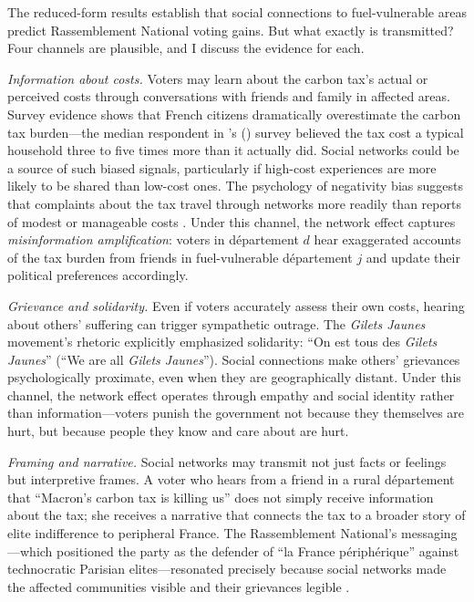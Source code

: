 \documentclass[12pt]{article}
\newcommand{\rn}{Rassemblement National}
\newcommand{\gj}{\textit{Gilets Jaunes}}
\newcommand{\dept}{d\'{e}partement}
\begin{document}
The reduced-form results establish that social connections to fuel-vulnerable areas predict \rn{} voting gains. But what exactly is transmitted? Four channels are plausible, and I discuss the evidence for each.

\textit{Information about costs.} Voters may learn about the carbon tax's actual or perceived costs through conversations with friends and family in affected areas. Survey evidence shows that French citizens dramatically overestimate the carbon tax burden---the median respondent in \citeauthor{douenne2022yellow}'s (\citeyear{douenne2022yellow}) survey believed the tax cost a typical household three to five times more than it actually did. Social networks could be a source of such biased signals, particularly if high-cost experiences are more likely to be shared than low-cost ones. The psychology of negativity bias suggests that complaints about the tax travel through networks more readily than reports of modest or manageable costs \citep{halberstam2016homophily}. Under this channel, the network effect captures \textit{misinformation amplification}: voters in \dept{} $d$ hear exaggerated accounts of the tax burden from friends in fuel-vulnerable \dept{} $j$ and update their political preferences accordingly.

\textit{Grievance and solidarity.} Even if voters accurately assess their own costs, hearing about others' suffering can trigger sympathetic outrage. The \gj{} movement's rhetoric explicitly emphasized solidarity: ``On est tous des \textit{Gilets Jaunes}'' (``We are all \textit{Gilets Jaunes}''). Social connections make others' grievances psychologically proximate, even when they are geographically distant. Under this channel, the network effect operates through empathy and social identity rather than information---voters punish the government not because they themselves are hurt, but because people they know and care about are hurt.

\textit{Framing and narrative.} Social networks may transmit not just facts or feelings but interpretive frames. A voter who hears from a friend in a rural \dept{} that ``Macron's carbon tax is killing us'' does not simply receive information about the tax; she receives a narrative that connects the tax to a broader story of elite indifference to peripheral France. The \rn{}'s messaging---which positioned the party as the defender of ``la France p\'{e}riph\'{e}rique'' against technocratic Parisian elites---resonated precisely because social networks made the affected communities visible and their grievances legible \citep{stantcheva2022understanding}.
\end{document}
